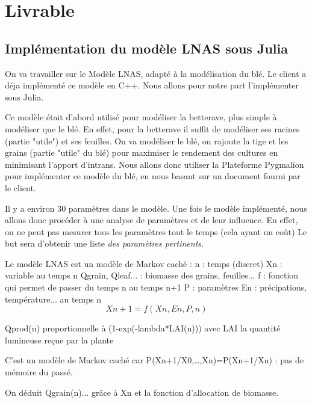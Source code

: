 \section{Livrable}
\subsection{Implémentation du modèle LNAS sous Julia}
On va travailler sur le Modèle LNAS, adapté à la modélisation du blé. 
Le client a déja implémenté ce modèle en C++. Nous allons pour notre part l'implémenter sous Julia.

Ce modèle était d'abord utilisé pour modéliser la betterave, plus simple à modéliser que le blé. En effet, pour la betterave il suffit de modéliser ses racines (partie "utile") et ses feuilles.
On va modéliser le blé, on rajoute la tige et les grains (partie "utile" du blé) pour maximiser le rendement des cultures en minimisant l’apport d’intrans.
Nous allons donc utiliser la Plateforme Pygmalion pour implémenter ce modèle du blé, en nous basant sur un document fourni par le client.

Il y a environ 30 paramètres dans le modèle. Une fois le modèle implémenté, nous allons donc procéder à une analyse de paramètres et de leur influence. En effet, on ne peut pas mesurer tous les paramètres tout le temps (cela ayant un coût) 
Le but sera d'obtenir une liste \textit{des paramètres pertinents.}

Le modèle LNAS est un modèle de Markov caché : 
n : temps (discret)
Xn : variable au temps n
Qgrain, Qleaf... : biomasse des grains, feuilles...
f : fonction qui permet de passer du temps n au temps n+1
P : paramètres
En : précipations, température... au temps n
\begin{equation}
Xn+1=f(Xn,En,P,n)
\end{equation} 

Qprod(n) proportionnelle à (1-exp(-lambda*LAI(n))) avec LAI la quantité lumineuse reçue par la plante

C’est un modèle de Markov caché car P(Xn+1/X0,…,Xn)=P(Xn+1/Xn) : pas de mémoire du passé.

On déduit Qgrain(n)... grâce à Xn et la fonction d'allocation de biomasse.



